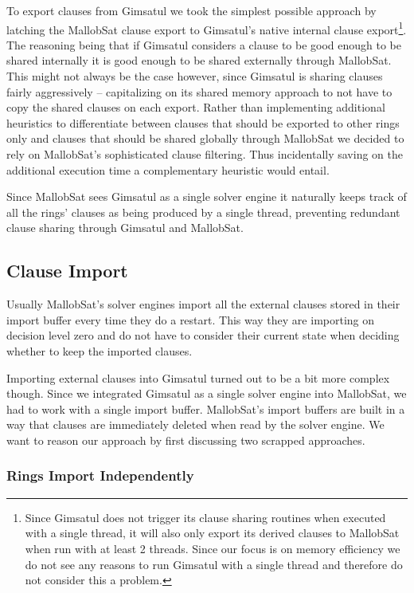 \documentclass[12pt,a4paper,twoside]{scrartcl}
\numberwithin{equation}{section}
\begin{document}
To export clauses from Gimsatul we took the simplest possible approach by latching the MallobSat clause export to Gimsatul's native internal clause export\footnote{Since Gimsatul does not trigger its clause sharing routines when executed with a single thread, it will also only export its derived clauses to MallobSat when run with at least 2 threads. Since our focus is on memory efficiency we do not see any reasons to run Gimsatul with a single thread and therefore do not consider this a problem.}. The reasoning being that if Gimsatul considers a clause to be good enough to be shared internally it is good enough to be shared externally through MallobSat. This might not always be the case however, since Gimsatul is sharing clauses fairly aggressively -- capitalizing on its shared memory approach to not have to copy the shared clauses on each export. Rather than implementing additional heuristics to differentiate between clauses that should be exported to other rings only and clauses that should be shared globally through MallobSat we decided to rely on MallobSat's sophisticated clause filtering. Thus incidentally saving on the additional execution time a complementary heuristic would entail.

Since MallobSat sees Gimsatul as a single solver engine it naturally keeps track of all the rings' clauses as being produced by a single thread, preventing redundant clause sharing through Gimsatul and MallobSat.

\subsection{Clause Import}

Usually MallobSat's solver engines import all the external clauses stored in their import buffer every time they do a restart. This way they are importing on decision level zero and do not have to consider their current state when deciding whether to keep the imported clauses. 

Importing external clauses into Gimsatul turned out to be a bit more complex though. Since we integrated Gimsatul as a single solver engine into MallobSat, we had to work with a single import buffer. MallobSat's import buffers are built in a way that clauses are immediately deleted when read by the solver engine. We want to reason our approach by first discussing two scrapped approaches.

\subsubsection{Rings Import Independently}
\end{document}
